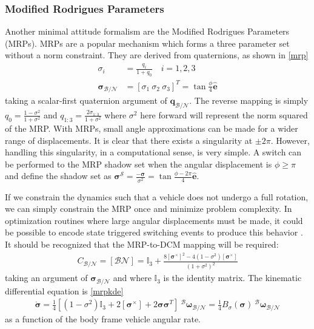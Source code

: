 \documentclass[conf]{new-aiaa}
\begin{document}
\subsubsection{Modified Rodrigues Parameters}
Another minimal attitude formalism are the Modified Rodrigues Parameters (MRPs). 
MRPs are a popular mechanism which forms a three parameter set without a norm constraint. They are derived from quaternions, as shown in \ref{mrp}
%
\begin{align}
\label{mrp}
	\sigma_i &= \frac{q_i}{1+q_0} \quad i = 1,2,3 \\
	\boldsymbol{\sigma}_\mathcal{B/N} &= [\sigma_1 \ \sigma_2 \ \sigma_3]^T = \tan\frac{\phi}{4}\hat{\bm{e}}
\end{align}
taking a scalar-first quaternion argument of $\bm{q}_\mathcal{B/N}$. The reverse mapping is simply $q_0 = \frac{1-\sigma^2}{1+\sigma^2}$ and $q_{1:3} = \frac{2\sigma_{1:3}}{1+\sigma^2}$ where $\sigma^2$ here forward will represent the norm squared of the MRP. With MRPs, small angle approximations can be made for a wider range of displacements. It is clear that there exists a singularity at $\pm 2\pi$. However, handling this singularity, in a computational sense, is very simple. A switch can be performed to the MRP shadow set when the angular displacement is $\phi \geq \pi$ and define the shadow set as $\boldsymbol{\sigma}^\mathcal{S} = \frac{-\boldsymbol{\sigma}}{\sigma^2} = \tan{\frac{\phi-2\pi}{4}}\hat{\bm{e}}$. 

If we constrain the dynamics such that a vehicle does not undergo a full rotation, we can simply constrain the MRP once and minimize problem complexity. In optimization routines where large angular displacements must be made, it could be possible to encode state triggered switching events to produce this behavior \cite{szmuk2019successive}. It should be recognized that the MRP-to-DCM mapping will be required:
\begin{align}
\label{mrp2c}
	C_{\mathcal{B/N}} = [\mathcal{BN}]= \mathbb{I}_3 +  \frac{8[\boldsymbol{\sigma}^\times]^2 - 4(1-\sigma^2)[\boldsymbol{\sigma}^\times]}{(1+\sigma^2)^2}
\end{align}
taking an argument of $\boldsymbol{\sigma}_\mathcal{B/N}$ and where $\mathbb{I}_3$ is the identity matrix. The kinematic differential equation is \ref{mrpkde}
%
\begin{align}
\label{mrpkde}
	\dot{\boldsymbol{\sigma}} = \frac{1}{4}[(1-\sigma^2)\mathbb{I}_3 +  2[\boldsymbol{\sigma}^\times] + 2\boldsymbol{\sigma}\boldsymbol{\sigma}^T] \ ^\mathcal{B}\boldsymbol{\omega}_\mathcal{B/N} = \frac{1}{4}B_\sigma(\boldsymbol{\sigma}) \ ^\mathcal{B}\boldsymbol{\omega}_\mathcal{B/N}
\end{align}
as a function of the body frame vehicle angular rate.
\end{document}
